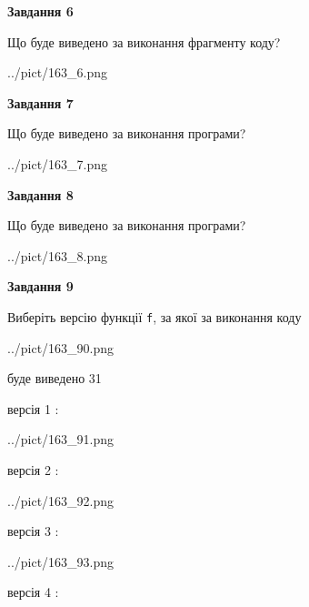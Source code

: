 \documentclass[12pt, ukrainian]{article}
\def\code#1{\Verb!#1!}
\begin{document}
{\begin {large}
{\begin {center}\textbf{Завдання 6}\end {center}}

Що буде виведено за виконання фрагменту коду?\par
\begin{center}
	{../pict/163_6.png}
\end{center}
\newpage

{\begin {center}\textbf{Завдання 7}\end {center}}

Що буде виведено за виконання програми?\par
\begin{center}
	{../pict/163_7.png}
\end{center}
\newpage

{\begin {center}\textbf{Завдання 8}\end {center}}

Що буде виведено за виконання програми?\par
\begin{center}
	{../pict/163_8.png}
\end{center}
\newpage

{\begin {center}\textbf{Завдання 9}\end {center}}

Виберіть версію функції \code{f}, за якої за виконання коду
\begin{center}
	{../pict/163_90.png}
\end{center}
буде виведено 31

\vspace{5mm}
версія 1 :

\begin{center}
	{../pict/163_91.png}
\end{center}
версія 2 :

\begin{center}
	{../pict/163_92.png}
\end{center}
версія 3 :

\begin{center}
	{../pict/163_93.png}
\end{center}
версія 4 :


\end{large}}
\end{document}
